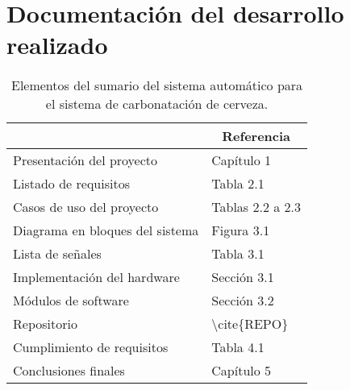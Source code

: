 \section{Documentación del desarrollo realizado}

\begin{table}[H]
\centering
\begin{tabular}{|l|l|}
\hline
\rowcolor[HTML]{EFEFEF} 
\multicolumn{1}{|c|}{\cellcolor[HTML]{EFEFEF}\textbf{Elemento}} & \multicolumn{1}{c|}{\cellcolor[HTML]{EFEFEF}\textbf{Referencia}} \\ \hline
Presentación del proyecto                                       & Capítulo 1                                                       \\ \hline
Listado de requisitos                                           & Tabla 2.1                                                        \\ \hline
Casos de uso del proyecto                                       & Tablas 2.2 a 2.3                                                 \\ \hline
Diagrama en bloques del sistema                                 & Figura 3.1                                                       \\ \hline
Lista de señales                                                & Tabla 3.1                                                        \\ \hline
Implementación del hardware                                     & Sección 3.1                                                      \\ \hline
Módulos de software                                             & Sección 3.2                                                      \\ \hline
Repositorio                                                     & \textbackslash{}cite\{REPO\}                                     \\ \hline
Cumplimiento de requisitos                                      & Tabla 4.1                                                        \\ \hline
Conclusiones finales                                            & Capítulo 5                                                       \\ \hline
\end{tabular}
\caption{Elementos del sumario del sistema automático para el sistema de carbonatación de cerveza.}
\label{table:documentacion}
\end{table}

